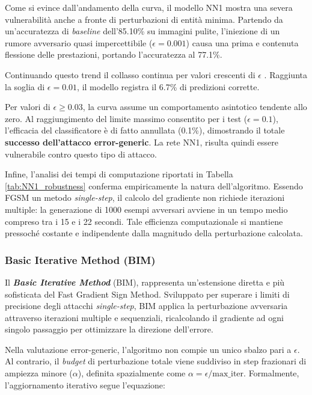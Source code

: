 \documentclass[a4paper, 12pt]{article}
\begin{document}
Come si evince dall'andamento della curva, il modello NN1 mostra una severa vulnerabilità anche a fronte di perturbazioni di entità minima. Partendo da un'accuratezza di \textit{baseline} dell'85.10\% su immagini pulite, l'iniezione di un rumore avversario quasi impercettibile ($\epsilon = 0.001$) causa una prima e contenuta flessione delle prestazioni, portando l'accuratezza al 77.1\%. 

Continuando questo trend il collasso continua per valori crescenti di $\epsilon$ . Raggiunta la soglia di $\epsilon = 0.01$, il modello registra il 6.7\% di predizioni corrette.

Per valori di $\epsilon \ge 0.03$, la curva assume un comportamento asintotico tendente allo zero. Al raggiungimento del limite massimo consentito per i test ($\epsilon = 0.1$), l'efficacia del classificatore è di fatto annullata (0.1\%), dimostrando il totale \textbf{successo dell'attacco error-generic}. La rete NN1, risulta quindi essere vulnerabile contro questo tipo di attacco.

Infine, l'analisi dei tempi di computazione riportati in Tabella \ref{tab:NN1_robustness} conferma empiricamente la natura dell'algoritmo. Essendo FGSM un metodo \textit{single-step}, il calcolo del gradiente non richiede iterazioni multiple: la generazione di 1000 esempi avversari avviene in un tempo medio compreso tra i 15 e i 22 secondi. Tale efficienza computazionale si mantiene pressoché costante e indipendente dalla magnitudo della perturbazione calcolata.

\vspace{10pt}

\subsubsection{Basic Iterative Method (BIM)}
Il \textit{\textbf{Basic Iterative Method}} (BIM), rappresenta un'estensione diretta e più sofisticata del Fast Gradient Sign Method. Sviluppato per superare i limiti di precisione degli attacchi \textit{single-step}, BIM applica la perturbazione avversaria attraverso iterazioni multiple e sequenziali, ricalcolando il gradiente ad ogni singolo passaggio per ottimizzare la direzione dell'errore.

Nella valutazione error-generic, l'algoritmo non compie un unico sbalzo pari a $\epsilon$. Al contrario, il \textit{budget} di perturbazione totale viene suddiviso in step frazionari di ampiezza minore ($\alpha$), definita spazialmente come $\alpha = \epsilon / \text{max\_iter}$. Formalmente, l'aggiornamento iterativo segue l'equazione:
\end{document}
